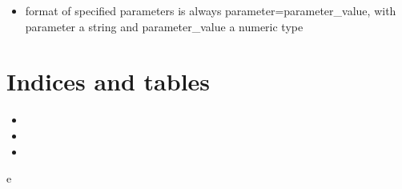 \documentclass[letterpaper,10pt,english]{sphinxmanual}
\begin{document}
\begin{fulllineitems}
\begin{fulllineitems}
\begin{description}
\begin{description}
\begin{itemize}
\item {} 
format of specified parameters is always parameter=parameter\_value, with parameter a string and parameter\_value a numeric type

\end{itemize}

\end{description}

\end{description}

\end{fulllineitems}


\end{fulllineitems}



\chapter{Indices and tables}
\label{\detokenize{masta:indices-and-tables}}\begin{itemize}
\item {} 

\item {} 

\item {} 

\end{itemize}


\renewcommand{\indexname}{Python Module Index}
\begin{sphinxtheindex}
\def\bigletter#1{{\Large\sffamily#1}\nopagebreak\vspace{1mm}}
\bigletter{e}
\item {}
\end{sphinxtheindex}

\renewcommand{\indexname}{Index}
\printindex
\end{document}
